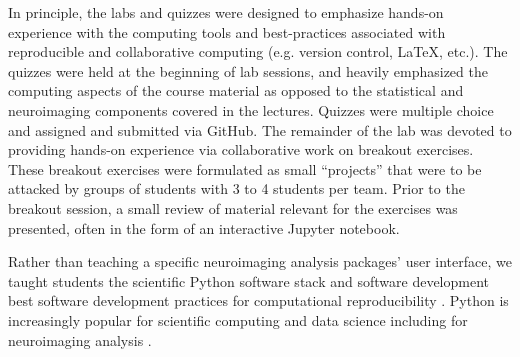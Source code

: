 In principle, the labs and quizzes were designed to emphasize hands-on 
experience with the computing tools and best-practices associated with
reproducible and collaborative computing (e.g. version control, \LaTeX, etc.).
The quizzes were held at the beginning of lab sessions, and heavily emphasized
the computing aspects of the course material as opposed to the statistical and
neuroimaging components covered in the lectures.
Quizzes were multiple choice and assigned and submitted via GitHub.
The remainder of the lab was devoted to providing hands-on experience via
collaborative work on breakout exercises.
These breakout exercises were formulated as small ``projects'' that were to be
attacked by groups of students with 3 to 4 students per team.
Prior to the breakout session, a small review of material relevant for the 
exercises was presented, often in the form of an interactive Jupyter notebook.

Rather than teaching a specific neuroimaging analysis packages' user interface,
we taught students the scientific Python software stack
\citep{millman2011python, perez2011python} and software development best
software development practices for computational reproducibility \citep{millman2014developing}.
Python is increasingly popular for scientific computing and data science
including for neuroimaging analysis \citep{millman2007analysis}.


